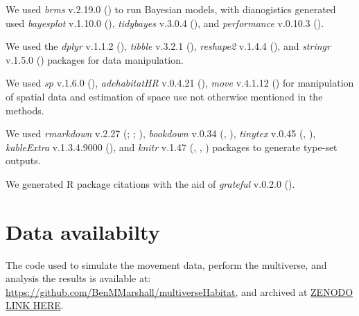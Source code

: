 \documentclass[10pt,a4paper]{article}
\begin{document}
We used \emph{brms} v.2.19.0 () to run Bayesian models, with dianogistics generated used \emph{bayesplot} v.1.10.0 (), \emph{tidybayes} v.3.0.4 (), and \emph{performance} v.0.10.3 ().

We used the \emph{dplyr} v.1.1.2 (), \emph{tibble} v.3.2.1 (), \emph{reshape2} v.1.4.4 (), and \emph{stringr} v.1.5.0 () packages for data manipulation.

We used \emph{sp} v.1.6.0 (), \emph{adehabitatHR} v.0.4.21 (), \emph{move} v.4.1.12 () for manipulation of spatial data and estimation of space use not otherwise mentioned in the methods.

We used \emph{rmarkdown} v.2.27 (; ; ), \emph{bookdown} v.0.34 (, ), \emph{tinytex} v.0.45 (, ), \emph{kableExtra} v.1.3.4.9000 (), and \emph{knitr} v.1.47 (, , ) packages to generate type-set outputs.

We generated R package citations with the aid of \emph{grateful} v.0.2.0 ().

\section{Data availabilty}\label{data-availabilty}

The code used to simulate the movement data, perform the multiverse, and analysis the results is available at: \url{https://github.com/BenMMarshall/multiverseHabitat}, and archived at \href{zenodo.org\%20-\%20FIX\%20THIS}{ZENODO LINK HERE}.

\clearpage
\end{document}
